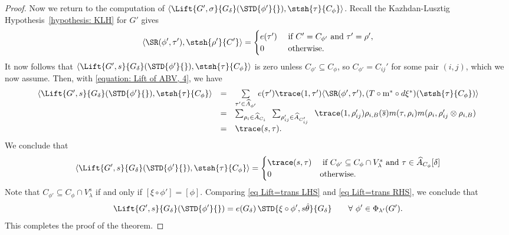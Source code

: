 \documentclass[11pt,letterpaper]{amsart}
\newcommand{\calm}{\textrm{m}}
\numberwithin{equation}{section}
\begin{document}
\begin{proof}
Now we return to the computation of $\langle \Lift{G',\sigma}{G_\delta}(\STD{\phi'}{}), \stsh{\tau}{C_{\phi}} \rangle$. Recall the Kazhdan-Lusztig Hypothesis~\ref{hypothesis: KLH} for $G'$ gives
\[ 
\langle \SR(\phi', \tau'), \stsh{\rho'}{C'} \rangle
= 
\begin{cases}
    e(\tau') &\text{ if } C'=C_{\phi'} \text{ and } \tau'=\rho',\\
    0 &\text{ otherwise.}
\end{cases}
\]
It now follows that
$\langle \Lift{G',s}{G_\delta}(\STD{\phi'}{}), \stsh{\tau}{C_{\phi}} \rangle$ is zero unless $C_{\phi'}\subseteq C_{\phi}$, so $C_{\phi'}=C_{ij}'$ for some pair $(i,j)$, which we now assume. Then, with \eqref{equation: Lift of ABV, 4}, we have
\begin{equation*}
    \begin{array}{rcl}
     \langle \Lift{G',s}{G_\delta}(\STD{\phi'}{}), \stsh{\tau}{C_{\phi}} \rangle
     &=& 
     \sum\limits_{\tau'\in \widehat{A}_{\phi'}} e(\tau') \trace(1,\tau') \langle \SR(\phi',\tau'), (T\circ \calm^{\ast} \circ  d\xi^*)(\stsh{\tau}{C_{\phi}}) \rangle\\
    &=& 
    \sum_{\rho_i \in \widehat{A}_{C_i}} 
    \hskip5pt
     \sum_{\rho_{ij}' \in \widehat{A}_{C_{ij}'}}  
    \hskip5pt
  \trace(1,\rho_{ij}') \rho_{i,B}(\overline{s}) m(\tau, \rho_i) m(\rho_i, \rho_{ij}' \otimes \rho_{i,B}) \\
    &=& \trace(s, \tau).
    \end{array}
\end{equation*}
We conclude that
\begin{equation}\label{eq Lift=trans LHS}
    \langle \Lift{G',s}{G_\delta}(\STD{\phi'}{}), \stsh{\tau}{C_{\phi}} \rangle
= 
\begin{cases}
    \trace (s, \tau ) & \text{ if } C_{\phi'} \subseteq C_\phi \cap V_{\lambda}^{s} \text{ and }\tau \in \widehat{A}_{C_{\phi}}[\delta] \\
    0 & \text{otherwise}.
\end{cases}
\end{equation}
Note that $C_{\phi'} \subseteq C_\phi \cap V_{\lambda}^{s}$ if and only if $[\xi\circ\phi'] = [\phi] $. Comparing \eqref{eq Lift=trans LHS} and \eqref{eq Lift=trans RHS}, we conclude that 
\[\Lift{G',s}{G_\delta}(\STD{\phi'}{}) = e(G_\delta)\, \STD{\xi\circ\phi',{s{\hat\theta}}}{G_\delta}
\qquad \forall\ 
\phi'\in \Phi_{\lambda'}(G').\]
This completes the proof of the theorem.
\end{proof}
\end{document}
